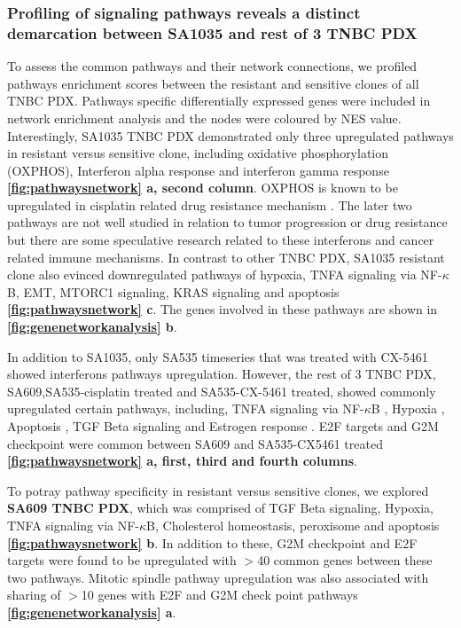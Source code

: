 \subsubsection{Profiling of signaling pathways reveals a distinct demarcation between SA1035 and rest of 3 TNBC PDX}
To assess the common pathways and their network connections, 
we profiled pathways enrichment scores between the resistant and sensitive clones of all TNBC PDX. 
Pathways specific differentially expressed genes were included in network enrichment analysis and the nodes were coloured by NES value. Interestingly, SA1035 TNBC PDX demonstrated only three upregulated pathways in resistant versus sensitive clone, including oxidative phosphorylation (OXPHOS), Interferon alpha response \cite{provance2019deciphering} and interferon gamma response \cite{mojic2018dark} \textbf{\autoref{fig:pathwaysnetwork} a, second column}. \ac{OXPHOS} is known to be upregulated in cisplatin related drug resistance mechanism \cite{lee2017myc}. The later two pathways are not well studied in relation to tumor progression or drug resistance but there are some speculative research related to these interferons and cancer related immune mechanisms. In contrast to other TNBC PDX, SA1035 resistant clone also evinced downregulated pathways of hypoxia, TNFA signaling via NF-$\kappa$B, \ac{EMT}, MTORC1 signaling, KRAS signaling and apoptosis {\textbf{\autoref{fig:pathwaysnetwork} c}}. The genes involved in these pathways are shown in \textbf{\autoref{fig:genenetworkanalysis} b}.

In addition to SA1035, only SA535 timeseries that was treated with CX-5461 showed interferons pathways upregulation. However, the rest of 3 TNBC PDX, SA609,SA535-cisplatin treated and SA535-CX-5461 treated, showed commonly upregulated certain pathways, including, TNFA signaling via NF-$\kappa$B \cite{lagunas2008nuclear,ito2015down, ryan2019targeting}, Hypoxia \cite{lee2012hypoxia, mcevoy2015identifying, deben2018hypoxia,li2019erk}, Apoptosis \cite{panaretakis2012cisplatin}, TGF Beta signaling \cite{zhang2019tgfbeta1} and Estrogen response \cite{zhu2018er}. E2F targets \cite{zheng2020upregulation} and G2M checkpoint \cite{visconti2016cell} were common between SA609 and SA535-CX5461 treated \textbf{\autoref{fig:pathwaysnetwork} a, first, third and fourth columns}. 

To potray pathway specificity in resistant versus sensitive clones, we explored \textbf{SA609 TNBC PDX}, which was  comprised of TGF Beta signaling, Hypoxia, TNFA signaling via NF-$\kappa$B, Cholesterol homeostasis, peroxisome and apoptosis \textbf{\autoref{fig:pathwaysnetwork} b}. In addition to these, G2M checkpoint and E2F targets were found to be upregulated with $>$40 common genes between these two pathways. Mitotic spindle pathway upregulation was also associated with sharing of $>$10 genes with E2F and G2M check point pathways \textbf{\autoref{fig:genenetworkanalysis} a}.

